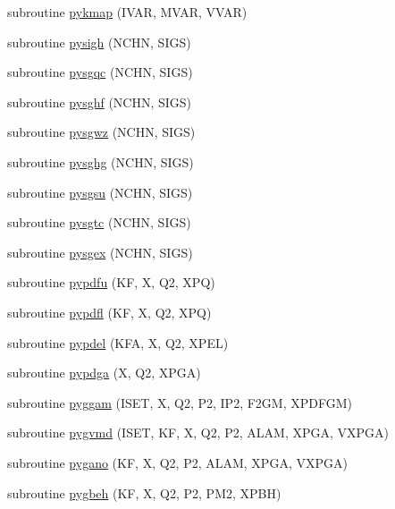 \begin{DoxyCompactItemize}
\item 
subroutine \hyperlink{pythia-6_84_824_8f_a9c057fbd857323d35ea39a826b1fa151}{pykmap} (I\+V\+AR, M\+V\+AR, V\+V\+AR)
\item 
subroutine \hyperlink{pythia-6_84_824_8f_a3ccdee32be69df9daf5605283165a012}{pysigh} (N\+C\+HN, S\+I\+GS)
\item 
subroutine \hyperlink{pythia-6_84_824_8f_a370a25c3139b210db10c7b1a02289deb}{pysgqc} (N\+C\+HN, S\+I\+GS)
\item 
subroutine \hyperlink{pythia-6_84_824_8f_a77c632d5235f03df7809688a7d6419bf}{pysghf} (N\+C\+HN, S\+I\+GS)
\item 
subroutine \hyperlink{pythia-6_84_824_8f_a7e00d0cba57c47a25b6546e4fd054fd3}{pysgwz} (N\+C\+HN, S\+I\+GS)
\item 
subroutine \hyperlink{pythia-6_84_824_8f_a57a12a8bdfcf423e5b0ed01349b0ff46}{pysghg} (N\+C\+HN, S\+I\+GS)
\item 
subroutine \hyperlink{pythia-6_84_824_8f_a3bcc54cc63edef034e45de8d31a94568}{pysgsu} (N\+C\+HN, S\+I\+GS)
\item 
subroutine \hyperlink{pythia-6_84_824_8f_a53e5da7d043dcc4d55c1be6aa5d65423}{pysgtc} (N\+C\+HN, S\+I\+GS)
\item 
subroutine \hyperlink{pythia-6_84_824_8f_a3e8b67e77bc0f5b4e190277a551e381f}{pysgex} (N\+C\+HN, S\+I\+GS)
\item 
subroutine \hyperlink{pythia-6_84_824_8f_a18485907fca6114e02a4ea4be006a91e}{pypdfu} (KF, X, Q2, X\+PQ)
\item 
subroutine \hyperlink{pythia-6_84_824_8f_aeceae4435f53744a1fd6d16580b88e9b}{pypdfl} (KF, X, Q2, X\+PQ)
\item 
subroutine \hyperlink{pythia-6_84_824_8f_a685bfaaf4e371dea879c7215f06ef963}{pypdel} (K\+FA, X, Q2, X\+P\+EL)
\item 
subroutine \hyperlink{pythia-6_84_824_8f_adaeea1cf93a90348771583d1ca460c5a}{pypdga} (X, Q2, X\+P\+GA)
\item 
subroutine \hyperlink{pythia-6_84_824_8f_a5d921e74d5d3170e13e61189727bb8e4}{pyggam} (I\+S\+ET, X, Q2, P2, I\+P2, F2\+GM, X\+P\+D\+F\+GM)
\item 
subroutine \hyperlink{pythia-6_84_824_8f_a6b802d62748ef3052e945d88179ab875}{pygvmd} (I\+S\+ET, KF, X, Q2, P2, A\+L\+AM, X\+P\+GA, V\+X\+P\+GA)
\item 
subroutine \hyperlink{pythia-6_84_824_8f_a055632fad3ca0e02e8fd6c3e1111633d}{pygano} (KF, X, Q2, P2, A\+L\+AM, X\+P\+GA, V\+X\+P\+GA)
\item 
subroutine \hyperlink{pythia-6_84_824_8f_af5ad5b58bca45571f9326336c1b90006}{pygbeh} (KF, X, Q2, P2, P\+M2, X\+P\+BH)

\end{DoxyCompactItemize}
